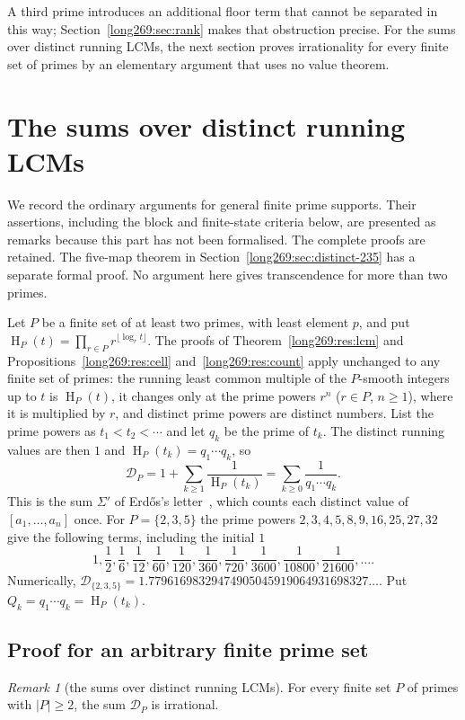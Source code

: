 \documentclass[11pt]{article}
\theoremstyle{remark}
\newtheorem{recordremark}[theorem]{Remark}
\renewenvironment{remark}[1][]{\begin{recordremark}[#1]}{\end{recordremark}}
\theoremstyle{plain}
\newcommand{\hgt}{\operatorname{H}}
\begin{document}
A third prime introduces an additional floor term that cannot be separated
in this way; Section~\ref{long269:sec:rank} makes that obstruction precise.
For the sums over distinct running LCMs, the next section proves irrationality for
every finite set of primes by an elementary argument that uses no value
theorem.

\section{The sums over distinct running LCMs}
\label{long269:sec:distinct}

We record the ordinary arguments for general finite prime supports.
Their assertions, including the block and finite-state criteria below,
are presented as remarks because this part has not been formalised.
The complete proofs are retained. The five-map theorem in
Section~\ref{long269:sec:distinct-235} has a separate formal proof.
No argument here gives transcendence for more than two primes.

Let $P$ be a finite set of at least two primes, with least element $p$, and
put $\hgt_P(t)=\prod_{r\in P}r^{\lfloor\log_rt\rfloor}$.  The proofs of
Theorem~\ref{long269:res:lcm} and Propositions~\ref{long269:res:cell}
and~\ref{long269:res:count} apply unchanged to any finite set of primes: the
running least common multiple of the $P$-smooth integers up to $t$ is
$\hgt_P(t)$, it changes only at the prime powers $r^n$ ($r\in P$, $n\ge1$),
where it is multiplied by $r$, and distinct prime powers are distinct
numbers.  List the prime powers as $t_1<t_2<\cdots$ and let $q_k$ be the prime
of $t_k$.  The distinct running values are then $1$ and
$\hgt_P(t_k)=q_1\cdots q_k$, so
\begin{equation}\label{long269:eq:distinct-sum}
 \mathcal D_P=1+\sum_{k\ge1}\frac1{\hgt_P(t_k)}
 =\sum_{k\ge0}\frac1{q_1\cdots q_k}.
\end{equation}
This is the sum $\Sigma'$ of Erd\H{o}s's letter~\cite{erdos1974letter},
which counts each distinct value of $[a_1,\ldots,a_n]$ once.  For
$P=\{2,3,5\}$ the prime powers $2,3,4,5,8,9,16,25,27,32$ give the following terms,
including the initial $1$
\[
 1,\frac12,\frac16,\frac1{12},\frac1{60},\frac1{120},\frac1{360},\frac1{720},
 \frac1{3600},\frac1{10800},\frac1{21600},\ldots .
\]
Numerically, $\mathcal D_{\{2,3,5\}}=1.77961698329474905045919064931698327\ldots$.
Put $Q_k=q_1\cdots q_k=\hgt_P(t_k)$.

\subsection{Proof for an arbitrary finite prime set}\label{long269:sec:distinct-all}
\begin{remark}[the sums over distinct running LCMs]\label{long269:res:distinct-height-all}
For every finite set $P$ of primes with $|P|\ge2$, the sum $\mathcal D_P$
is irrational.
\end{remark}
\end{document}
